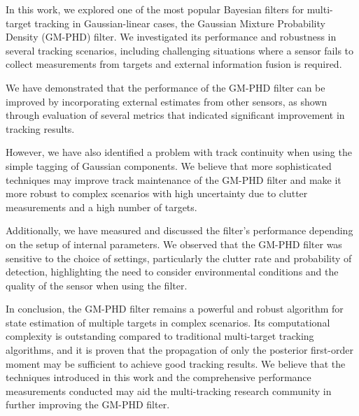 In this work, we explored one of the most popular Bayesian filters for multi-target tracking in Gaussian-linear cases, the Gaussian Mixture Probability Density (GM-PHD) filter. We investigated its performance and robustness in several tracking scenarios, including challenging situations where a sensor fails to collect measurements from targets and external information fusion is required.

We have demonstrated that the performance of the GM-PHD filter can be improved by incorporating external estimates from other sensors, as shown through evaluation of several metrics that indicated significant improvement in tracking results.

However, we have also identified a problem with track continuity when using the simple tagging of Gaussian components. We believe that more sophisticated techniques may improve track maintenance of the GM-PHD filter and make it more robust to complex scenarios with high uncertainty due to clutter measurements and a high number of targets.

Additionally, we have measured and discussed the filter's performance depending on the setup of internal parameters. We observed that the GM-PHD filter was sensitive to the choice of settings, particularly the clutter rate and probability of detection, highlighting the need to consider environmental conditions and the quality of the sensor when using the filter.

In conclusion, the GM-PHD filter remains a powerful and robust algorithm for state estimation of multiple targets in complex scenarios. Its computational complexity is outstanding compared to traditional multi-target tracking algorithms, and it is proven that the propagation of only the posterior first-order moment may be sufficient to achieve good tracking results. We believe that the techniques introduced in this work and the comprehensive performance measurements conducted may aid the multi-tracking research community in further improving the GM-PHD filter.
